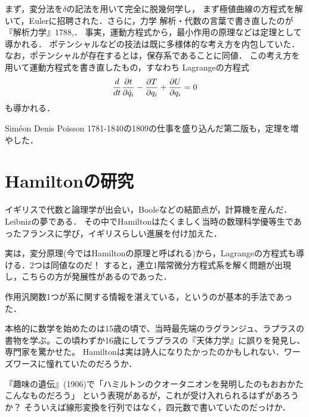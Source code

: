 \documentclass[uplatex,dvipdfmx]{jsreport}
\begin{document}
\begin{history}
    まず，変分法を$\delta$の記法を用いて完全に脱幾何学し，
    まず極値曲線の方程式を解いて，Eulerに招聘された．さらに，力学
    解析・代数の言葉で書き直したのが『解析力学』1788,\cite{Lagrange1788}．
    事実，運動方程式から，最小作用の原理などは定理として導かれる．
    ポテンシャルなどの技法は既に多様体的な考え方を内包していた．なお，ポテンシャルが存在するとは，保存系であることに同値．
    この考え方を用いて運動方程式を書き直したもの，すなわち
    Lagrangeの方程式
    \[\frac{d }{d t}\frac{\partial t}{\partial \dot{q}_i}-\frac{\partial T}{\partial q_i}+\frac{\partial U}{\partial q_i}=0\]
    も導かれる．

    Siméon Denis Poisson 1781-1840の1809の仕事を盛り込んだ第二版も，定理を増やした．
\end{history}

\section{Hamiltonの研究}

\begin{tcolorbox}[colframe=ForestGreen, colback=ForestGreen!10!white,breakable,colbacktitle=ForestGreen!40!white,coltitle=black,fonttitle=\bfseries\sffamily,
title=]
    イギリスで代数と論理学が出会い，Booleなどの結節点が，計算機を産んだ．Leibnizの夢である．
    その中でHamiltonはたくましく当時の数理科学優等生であったフランスに学び，イギリスらしい進展を付け加えた．

    実は，変分原理(今ではHamiltonの原理と呼ばれる)から，Lagrangeの方程式も導ける．2つは同値なのだ！
    すると，連立1階常微分方程式系を解く問題が出現し，こちらの方が発展性があるのであった．

    作用汎関数1つが系に関する情報を湛えている，というのが基本的手法であった．
\end{tcolorbox}

\begin{history}
    本格的に数学を始めたのは15歳の頃で、当時最先端のラグランジュ、ラプラスの書物を学ぶ。この頃わずか16歳にしてラプラスの『天体力学』に誤りを発見し、専門家を驚かせた。
    Hamiltonは実は詩人になりたかったのかもしれない．ワーズワースに憧れていたのだろうか．
\end{history}

『趣味の遺伝』(1906)で「ハミルトンのクオータニオンを発明したのもおおかたこんなものだろう」
という表現があるが，これが受け入れられるはずがあろうか？
そういえば線形変換を行列ではなく，四元数で書いていたのだっけか．
\end{document}
